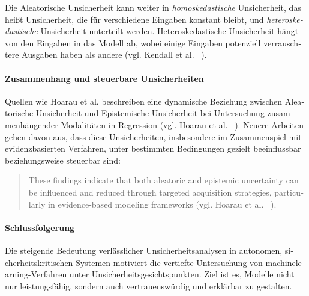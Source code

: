\begin{otherlanguage}{ngerman}
Die \gls{Aleatorische Unsicherheit} kann weiter in \textit{homoskedastische} Unsicherheit, das heißt Unsicherheit, die für verschiedene Eingaben konstant bleibt, und \textit{heteroskedastische} Unsicherheit unterteilt werden. Heteroskedastische Unsicherheit hängt von den Eingaben in das Modell ab, wobei einige Eingaben potenziell verrauschtere Ausgaben haben als andere (vgl. Kendall et al. ~\parencite[S. 2, Z. 1-5]{kendall2017}).

\paragraph{Zusammenhang und steuerbare Unsicherheiten} Quellen wie Hoarau et al. beschreiben eine dynamische Beziehung zwischen \gls{Aleatorische Unsicherheit} und \gls{Epistemische Unsicherheit} bei Untersuchung zusammenhängender Modalitäten in Regression (vgl. Hoarau et al. ~\parencite[S. 2, Z.10-14]{ArthurHoarau2025}). Neuere Arbeiten gehen davon aus, dass diese Unsicherheiten, insbesondere im Zusammenspiel mit evidenzbasierten Verfahren, unter bestimmten Bedingungen gezielt beeinflussbar beziehungsweise steuerbar sind: 

\begin{quote}
\glqq These findings indicate that both aleatoric and epistemic uncertainty can be influenced and reduced through targeted acquisition strategies, particularly in evidence-based modeling frameworks (vgl. Hoarau et al. ~\parencite[S.2, Z. 43-45]{ArthurHoarau2025}). \grqq{}
\end{quote}

\paragraph{Schlussfolgerung} Die steigende Bedeutung verlässlicher Unsicherheitsanalysen in autonomen, sicherheitskritischen Systemen motiviert die vertiefte Untersuchung von \gls{machinelearning}-Verfahren unter Unsicherheitsgesichtspunkten. Ziel ist es, Modelle nicht nur leistungsfähig, sondern auch vertrauenswürdig und erklärbar zu gestalten.



\end{otherlanguage}

